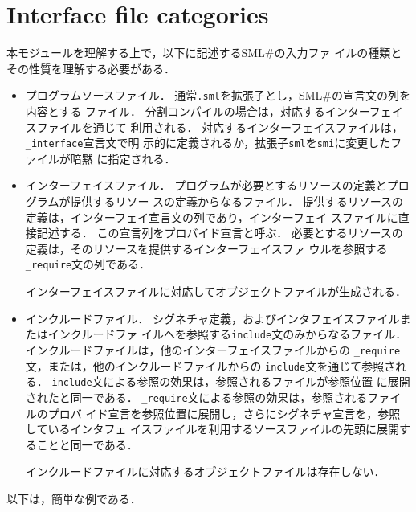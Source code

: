 \documentclass{jbook}
\newcommand{\txt}[2]{#2}
\newcommand{\smlsharp}{SML\#}
\newcommand{\code}[1]{\mbox{\large\tt #1}}
\begin{document}
\section{\txt{インターフェイスファイルのカテゴリ}{Interface file categories}}
	本モジュールを理解する上で，以下に記述する\smlsharp{}の入力ファ
イルの種類とその性質を理解する必要がある．
\begin{itemize}
\item プログラムソースファイル．
	通常\code{.sml}を拡張子とし，\smlsharp{}の宣言文の列を内容とする
ファイル．
	分割コンパイルの場合は，対応するインターフェイスファイルを通じて
利用される．
	対応するインターフェイスファイルは，\code{\_interface}宣言文で明
示的に定義されるか，拡張子\code{sml}を\code{smi}に変更したファイルが暗黙
に指定される．

\item インターフェイスファイル．
	プログラムが必要とするリソースの定義とプログラムが提供するリソー
スの定義からなるファイル．
	提供するリソースの定義は，インターフェイ宣言文の列であり，インターフェイ
スファイルに直接記述する．
	この宣言列をプロバイド宣言と呼ぶ．
	必要とするリソースの定義は，そのリソースを提供するインターフェイスファ
ウルを参照する\code{\_require}文の列である．

	インターフェイスファイルに対応してオブジェクトファイルが生成される．
	
\item インクルードファイル．
	シグネチャ定義，およびインタフェイスファイルまたはインクルードファ
イルへを参照する\code{include}文のみからなるファイル．
	インクルードファイルは，他のインターフェイスファイルからの
\code{\_require}文，または，他のインクルードファイルからの
\code{include}文を通じて参照される．
	\code{include}文による参照の効果は，参照されるファイルが参照位置
に展開されたと同一である．
	\code{\_require}文による参照の効果は，参照されるファイルのプロバ
イド宣言を参照位置に展開し，さらにシグネチャ宣言を，参照しているインタフェ
イスファイルを利用するソースファイルの先頭に展開することと同一である．

	インクルードファイルに対応するオブジェクトファイルは存在しない．
\end{itemize}
	以下は，簡単な例である．
\end{document}

